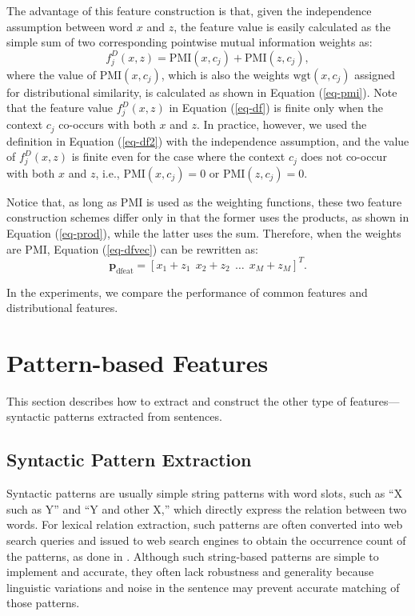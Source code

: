 \documentclass[english]{jnlp_1.4}
\begin{document}
The advantage of this feature construction is that, given the
independence assumption between word $x$ and $z$, the feature
value is easily calculated as the simple sum of two corresponding
pointwise mutual information weights as:
\begin{equation}
  f^D_j(x, z) = \mathrm{PMI}(x, c_j) + \mathrm{PMI}(z, c_j), \label{eq-df2}
\end{equation}
where the value of $\mathrm{PMI}(x, c_j)$, which is also the weights
$\mathrm{wgt}(x, c_j)$ assigned for distributional similarity, is
calculated as shown in Equation (\ref{eq-pmi}). Note that the feature
value $f^D_j(x, z)$ in Equation (\ref{eq-df}) is finite only when the
context $c_j$ co-occurs with both $x$ and $z$. In practice, however,
we used the definition in Equation (\ref{eq-df2}) with the
independence assumption, and the value of $f^D_j(x, z)$ is finite even
for the case where the context $c_j$ does not co-occur with both $x$
and $z$, i.e., $\mathrm{PMI}(x, c_j) = 0$ or $\mathrm{PMI}(z, c_j) = 0$.

Notice that, as long as PMI is used as the weighting functions, these
two feature construction schemes differ only in that the former uses
the products, as shown in Equation (\ref{eq-prod}), while the latter
uses the sum. Therefore, when the weights are PMI, Equation
(\ref{eq-dfvec}) can be rewritten as:
\begin{equation}
\mathbf{p}_{\mathrm{dfeat}} = [x_1+z_1\ \ x_2+z_2\ \ \dots\ \ x_M+z_M]^T.
\end{equation}

In the experiments, we compare the performance of common features and
distributional features. 


\section{Pattern-based Features}

This section describes how to extract and construct the other type of
features---syntactic patterns extracted from sentences.


\subsection{Syntactic Pattern Extraction}

Syntactic patterns are usually simple string patterns with word slots,
such as ``X such as Y'' and ``Y and other X,'' which directly express
the relation between two words. For lexical relation extraction, such
patterns are often converted into web search queries and issued to web
search engines to obtain the occurrence count of the patterns, as done
in \cite{Hearst:92,Lin:03,Mirkin:06,Pantel:06}.  Although such
string-based patterns are simple to implement and accurate, they often
lack robustness and generality because linguistic variations and noise
in the sentence may prevent accurate matching of those patterns.
\end{document}
